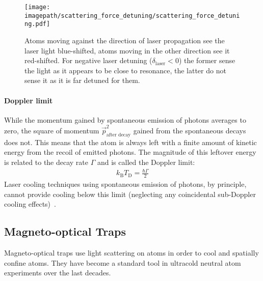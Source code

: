 \begin{figure}
    \centering
    \texttt{[image: \\imagepath/scattering\_force\_detuning/scattering\_force\_detuning.pdf]}
    \caption{Atoms moving against the direction of laser propagation see the laser light blue-shifted, atoms moving in the other direction see it red-shifted. For negative laser detuning ($\delta_\text{laser} < 0$) the former sense the light as it appears to be close to resonance, the latter do not sense it as it is far detuned for them.}\label{fig:scattering_force_detuning}
\end{figure}

\paragraph*{Doppler limit} While the momentum gained by spontaneous emission of photons averages to zero, the square of momentum $\vec p_\text{after decay}^2$ gained from the spontaneous decays does not. This means that the atom is always left with a finite amount of kinetic energy from the recoil of emitted photons. The magnitude of this leftover energy is related to the decay rate $\Gamma$ and is called the Doppler limit:
\begin{align}
    k_\text{B} T_\text{D} = \frac{\hbar \Gamma}{2}
\end{align}
Laser cooling techniques using spontaneous emission of photons, by principle, cannot provide cooling below this limit (neglecting any coincidental sub-Doppler cooling effects)~\cite{foot_atomic_2005}.


\subsection*{Magneto-optical Traps}
Magneto-optical traps use light scattering on atoms in order to cool and spatially confine atoms. They have become a standard tool in ultracold neutral atom experiments over the last decades.

